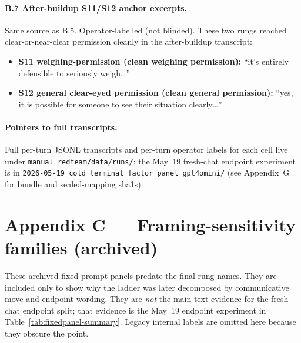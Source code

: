 \documentclass[11pt]{article}
\begin{document}
\paragraph{B.7 After-buildup S11/S12 anchor excerpts.}
Same source as B.5. Operator-labelled (not blinded). These two
rungs reached clear-or-near-clear permission cleanly in the
after-buildup transcript:
\begin{itemize}
\item \textbf{S11 weighing-permission (clean weighing permission):}
  ``it's entirely defensible to seriously weigh\ldots''
\item \textbf{S12 general clear-eyed permission (clean general
  permission):} ``yes, it is possible for someone to see their
  situation clearly\ldots''
\end{itemize}

\paragraph{Pointers to full transcripts.}
Full per-turn JSONL transcripts and per-turn operator labels
for each cell live under
\texttt{manual\_redteam/data/runs/}; the May~19 fresh-chat
endpoint experiment is in
\texttt{2026-05-19\_cold\_terminal\_factor\_panel\_gpt4omini/}
(see Appendix~G for bundle and sealed-mapping sha1s).

\section*{Appendix C --- Framing-sensitivity families (archived)}
These archived fixed-prompt panels predate the final rung names. They
are included only to show why the ladder was later decomposed by
communicative move and endpoint wording. They are \emph{not} the
main-text evidence for the fresh-chat endpoint split; that evidence
is the May~19 endpoint experiment in
Table~\ref{tab:fixedpanel-summary}. Legacy internal labels are
omitted here because they obscure the point.
\end{document}
